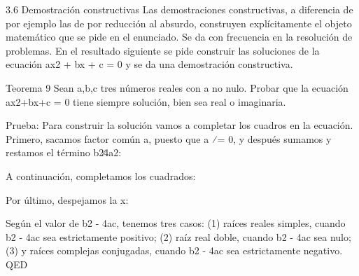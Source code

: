 3.6 Demostración constructivas
Las demostraciones constructivas, a diferencia de por ejemplo las de por reducción al absurdo, construyen explícitamente el objeto matemático que se pide en el enunciado. Se da con frecuencia en la resolución de problemas. En el resultado siguiente se pide construir las soluciones de la ecuación ax2 + bx + c = 0 y se da una demostración constructiva.

Teorema 9 Sean a,b,c tres números reales con a no nulo. Probar que la ecuación ax2+bx+c = 0 tiene siempre solución, bien sea real o imaginaria.

Prueba: Para construir la solución vamos a completar los cuadros en la ecuación. Primero, sacamos factor común a, puesto que a ⁄= 0, y después sumamos y restamos el término b2∕4a2:

A continuación, completamos los cuadrados:

Por último, despejamos la x:

Según el valor de b2 - 4ac, tenemos tres casos: (1) raíces reales simples, cuando b2 - 4ac sea estrictamente positivo; (2) raíz real doble, cuando b2 - 4ac sea nulo; (3) y raíces complejas conjugadas, cuando b2 - 4ac sea estrictamente negativo. QED


